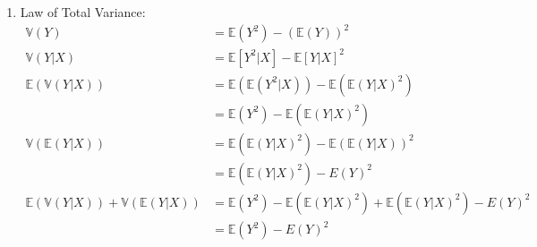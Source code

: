 \documentclass[11pt,a4paper]{article}
\begin{document}
\begin{enumerate}
\begin{enumerate}
				\item Law of Total Variance:
				\begin{align*}
				\mathbb{V}(Y) &= \mathbb{E}(Y^2) - (\mathbb{E}(Y))^2 \\
				\mathbb{V}(Y|X) &= \mathbb{E}[Y^2|X]-\mathbb{E}[Y|X]^2 \\
				\mathbb{E}(\mathbb{V}(Y|X)) &= \mathbb{E}(\mathbb{E}(Y^2|X)) - \mathbb{E}(\mathbb{E}(Y|X)^2)\\
				&= \mathbb{E}(Y^2) - \mathbb{E}(\mathbb{E}(Y|X)^2) \\
				\mathbb{V}(\mathbb{E}(Y|X)) &= \mathbb{E}(\mathbb{E}(Y|X)^2) - \mathbb{E}(\mathbb{E}(Y|X))^2 \\
				&= \mathbb{E}(\mathbb{E}(Y|X)^2) - E(Y)^2 \\
				\mathbb{E}(\mathbb{V}(Y|X)) + \mathbb{V}(\mathbb{E}(Y|X)) &= \mathbb{E}(Y^2) - \mathbb{E}(\mathbb{E}(Y|X)^2) + \mathbb{E}(\mathbb{E}(Y|X)^2) - E(Y)^2 \\
				&= \mathbb{E}(Y^2) - E(Y)^2
				\end{align*}
				
			\end{enumerate}
		

\end{enumerate}
\end{document}
